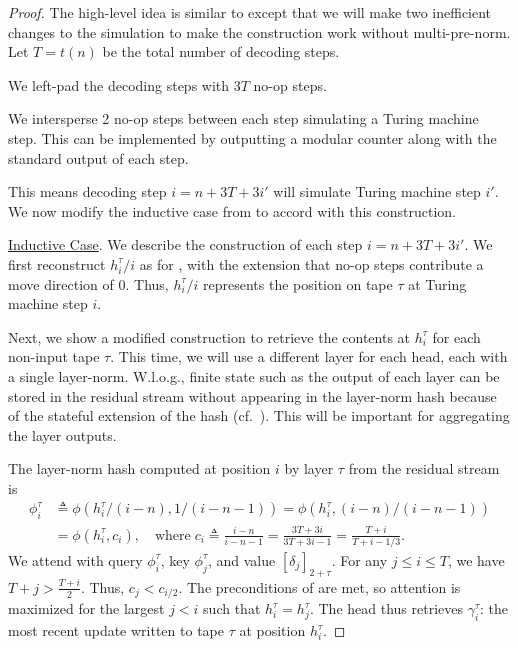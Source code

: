 \begin{proof}
    The high-level idea is similar to  except that we will make two inefficient changes to the simulation to make the construction work without multi-pre-norm. Let $T = t(n)$ be the total number of decoding steps.
    \begin{compactenum}
        \item We left-pad the decoding steps with $3T$ no-op steps. 
        
        \item We intersperse 2 no-op steps between each step simulating a Turing machine step. This can be implemented by outputting a modular counter along with the standard output of each step.
    \end{compactenum}
    This means decoding step $i = n + 3T + 3i'$ will simulate Turing machine step $i'$. We now modify the inductive case from  to accord with this construction.

    \underline{Inductive Case}. We describe the construction of each step $i = n + 3T + 3i'$. We first reconstruct $h^\tau_i / i$ as for , with the extension that no-op steps contribute a move direction of 0. Thus, $h^\tau_i / i$ represents the position on tape $\tau$ at Turing machine step $i$.


    Next, we show a modified construction to retrieve the contents at $h^\tau_i$ for each non-input tape $\tau$. This time, we will use a different layer for each head, each with a single layer-norm.
    W.l.o.g., finite state such as the output of each layer can be stored in the residual stream without appearing in the layer-norm hash because of the stateful extension of the hash (cf.~). This will be important for aggregating the layer outputs.

    The layer-norm hash computed at position $i$ by layer $\tau$ from the residual stream is 
    \begin{align*}
        \phi^\tau_i
        &\triangleq \phi(h^\tau_i / (i - n), 1/(i - n - 1)) = \phi(h^\tau_i, (i - n)/(i - n - 1)) \\
        &= \phi ( h^\tau_i, c_i), \quad \textrm{where} \; c_i \triangleq \frac{i - n}{i - n - 1} = \frac{3T + 3i}{3T + 3i - 1} = \frac{T + i}{T + i - 1/3}.
    \end{align*}
    We attend with query $\phi^\tau_i$, key $\phi^\tau_j$, and value $[\delta_j]_{2 + \tau}$.
    For any $j \leq i \leq T$, we have $T + j > \frac{T + i}{2}$. Thus, $c_j < c_{i/2}$. 
    The preconditions of  are met, so attention is maximized for the largest $j < i$ such that $h^\tau_i = h^\tau_j$. The head thus retrieves $\gamma^\tau_i$: the most recent update written to tape $\tau$ at position $h^\tau_i$. 


\end{proof}
